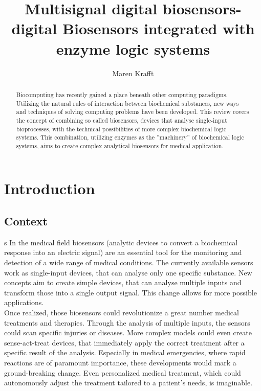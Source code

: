\documentclass[runningheads]{llncs}
\begin{document}
\title{Multisignal digital biosensors- digital Biosensors integrated with enzyme logic systems}
\author{Maren Krafft}
\maketitle        

      
\begin{abstract}
	
Biocomputing has recently gained a place beneath other computing paradigms. Utilizing the natural rules of interaction between biochemical substances, new ways and techniques of solving computing problems have been developed. This review covers the concept of combining so called biosensors, devices that analyse single-input bioprocesses, with the technical possibilities of more complex biochemical logic systems. This combination, utilizing enzymes as the ''machinery'' of biochemical logic systems, aims to create complex analytical biosensors for medical application.



\end{abstract}

\section{Introduction}

\subsection{Context}
s
	In the medical field biosensors (analytic devices to convert a biochemical response into an electric signal) are an essential tool for the monitoring and detection of a wide range of medical conditions. The currently available sensors work as single-input devices, that can analyse only one specific substance. New concepts aim to create simple devices, that can analyse multiple inputs and transform those into a single output signal. This change allows for more possible applications.\\
	Once realized, those biosensors could revolutionize a great number medical treatments and therapies. Through the analysis of multiple inputs, the sensors could scan specific injuries or diseases. More complex models could even create sense-act-treat devices, that immediately apply the correct treatment after a specific result of the analysis. Especially in medical emergencies, where rapid reactions are of paramount importance, these developments would mark a ground-breaking change. Even personalized medical treatment, which could autonomously adjust the treatment tailored to a patient’s needs, is imaginable.
	
\end{document}
